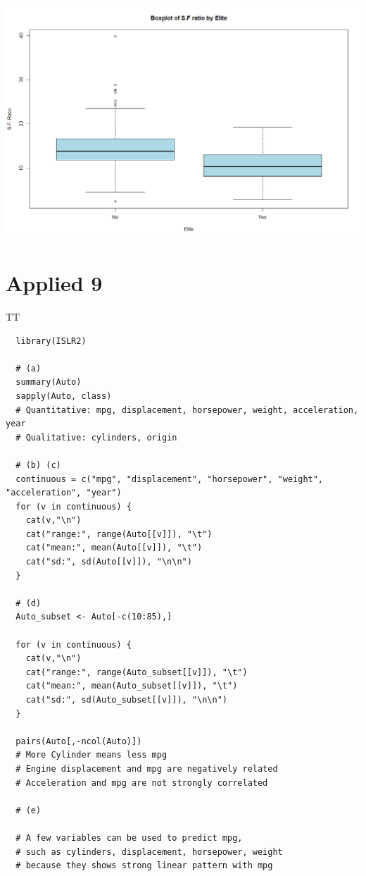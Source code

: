 \documentclass{article}
\let \extra T
\begin{document}
\includegraphics[scale=0.5]{cvi.png}
\fi


\newpage
\section*{Applied 9}

\ifx \extra T
\begin{verbatim}
  library(ISLR2)

  # (a)
  summary(Auto)
  sapply(Auto, class)
  # Quantitative: mpg, displacement, horsepower, weight, acceleration, year
  # Qualitative: cylinders, origin
  
  # (b) (c)
  continuous = c("mpg", "displacement", "horsepower", "weight", "acceleration", "year")
  for (v in continuous) {
    cat(v,"\n")
    cat("range:", range(Auto[[v]]), "\t")
    cat("mean:", mean(Auto[[v]]), "\t")
    cat("sd:", sd(Auto[[v]]), "\n\n")
  }
  
  # (d)
  Auto_subset <- Auto[-c(10:85),]
  
  for (v in continuous) {
    cat(v,"\n")
    cat("range:", range(Auto_subset[[v]]), "\t")
    cat("mean:", mean(Auto_subset[[v]]), "\t")
    cat("sd:", sd(Auto_subset[[v]]), "\n\n")
  }
  
  pairs(Auto[,-ncol(Auto)])
  # More Cylinder means less mpg
  # Engine displacement and mpg are negatively related
  # Acceleration and mpg are not strongly correlated
  
  # (e)
  
  # A few variables can be used to predict mpg, 
  # such as cylinders, displacement, horsepower, weight 
  # because they shows strong linear pattern with mpg

\end{verbatim}
\fi
\end{document}
